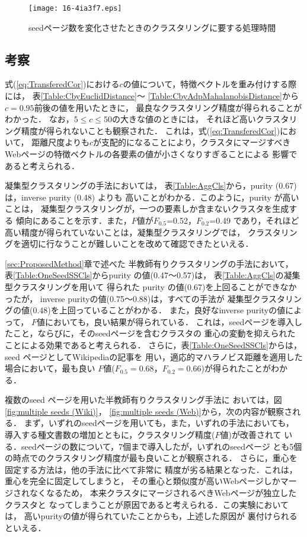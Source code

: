 \documentclass[japanese]{jnlp_1.4}
\begin{document}
\begin{figure}[t]
\begin{center}
\texttt{[image: 16-4ia3f7.eps]}
\end{center}
\caption{seedページ数を変化させたときのクラスタリングに要する処理時間}
\label{fig:time}
\end{figure}


\subsection{考察}
\label{subsec:Discussion}

式(\ref{eq:TransferedCor})における$c$の値について，特徴ベクトルを重み付けする際には，
表\ref{Table:CbyEuclidDistance}〜
\ref{Table:CbyAdpMahalanobisDistance}から
$c=0.95$前後の値を用いたときに，
最良なクラスタリング精度が得られることがわかった．
なお，$5\le c\le 50$の大きな値のときには，
それほど高いクラスタリング精度が得られないことも観察された．
これは，式(\ref{eq:TransferedCor})において，
距離尺度よりも$c$が支配的になることにより，クラスタにマージすべき
Webページの特徴ベクトルの各要素の値が小さくなりすぎることによる
影響であると考えられる．

凝集型クラスタリングの手法においては，
表\ref{Table:AggCls}から，purity (0.67) は，inverse purity (0.48) よりも
高いことがわかる．このように，purity が高いことは，
凝集型クラスタリングが，一つの要素しか含まないクラスタを生成する
傾向にあることを示す．また，$F$値が$F_{0.5}$=0.52，$F_{0.2}$=0.49
であり，それほど高い精度が得られていないことは，凝集型クラスタリングでは，
クラスタリングを適切に行なうことが難しいことを改めて確認できたといえる．

\ref{sec:ProposedMethod}章で述べた
半教師有りクラスタリングの手法において，
表\ref{Table:OneSeedSSCls}からpurity の値(0.47〜0.57)は，
表\ref{Table:AggCls}の凝集型クラスタリングを用いて
得られた purity の値(0.67)を上回ることができなかったが，
inverse purityの値(0.75〜0.88)は，すべての手法が
凝集型クラスタリングの値(0.48)を上回っていることがわかる．
また，良好なinverse purityの値によって，
$F$値においても，良い結果が得られている．
これは，seedページを導入したこと，ならびに，そのseedページを含むクラスタの
重心の変動を抑えられたことによる効果であると考えられる．
さらに，表\ref{Table:OneSeedSSCls}からは，seed ページとしてWikipediaの記事を
用い，適応的マハラノビス距離を適用した場合において，最も良い
$F$値($F_{0.5}=0.68$，$F_{0.2}=0.66$)が得られたことがわかる．

複数のseed ページを用いた半教師有りクラスタリング手法に
おいては，図\ref{fig:multiple seeds (Wiki)}，
\ref{fig:multiple seeds (Web)}から，次の内容が観察される．
まず，いずれのseedページを用いても，また，いずれの手法においても，
導入する種文書数の増加とともに，クラスタリング精度($F$値)が改善されて
いる．seedページの数について，7個まで導入したが，いずれのseedページ
とも5個の時点でのクラスタリング精度が最も良いことが観察される．
さらに，重心を固定する方法は，他の手法に比べて非常に
精度が劣る結果となった．これは，重心を完全に固定してしまうと，
その重心と類似度が高いWebページしかマージされなくなるため，
本来クラスタにマージされるべきWebページが独立したクラスタと
なってしまうことが原因であると考えられる．この実験においては，
高いpurityの値が得られていたことからも，上述した原因が
裏付けられるといえる．
\end{document}

